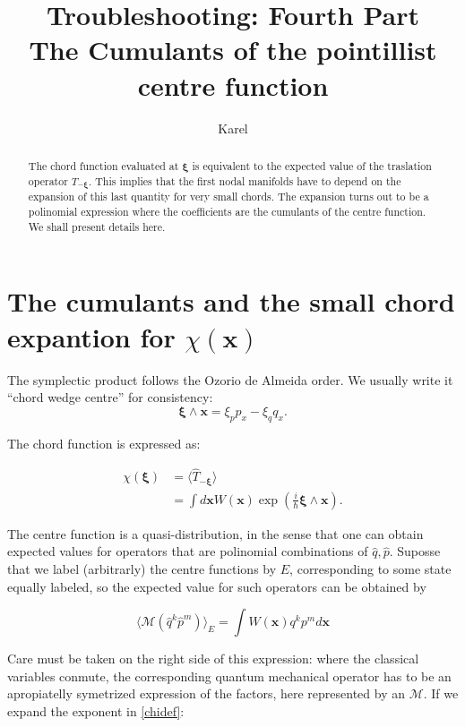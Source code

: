 \documentclass[a4paper,12pt]{article}
\title{ Troubleshooting: Fourth Part\\ The Cumulants of the pointillist centre function}
\author{Karel}
\newcommand{\ihb}{\frac{i}{\hbar}}
\newcommand{\xfase}{\mathbf{x}}
\newcommand{\xifase}{ {\boldsymbol{\xi}} }
\newcommand{\Prom}[2]{\langle #1\rangle_{#2}}
\begin{document}
\maketitle

\begin{abstract}
The chord function evaluated at $\xifase$ is equivalent to the
expected value of the traslation operator $T_{-\xifase}$. This implies
that the first nodal manifolds have to depend on the expansion of this
last quantity for very small chords. The expansion turns out to be
a polinomial expression where the coefficients are the 
cumulants of the centre function. We shall present details here. 
\end{abstract}


\section{The cumulants and the small chord expantion for $\chi(\xfase) $}

The symplectic product follows the Ozorio de Almeida order. We usually
write it ``chord wedge centre'' for consistency:
\begin{equation}
\xifase\wedge\xfase=\xi_p p_x -  \xi_q q_x.
\end{equation}

The chord function is expressed as:

\begin{align}\label{chidef}
\chi(\xifase) & = \langle \hat{T}_{ -\xifase } \rangle \\ 
& = \int d\xfase  W(\xfase) \exp( \ihb \xifase \wedge \xfase).
\end{align}

The centre function is a quasi-distribution, in the sense
that one can obtain expected values for operators that
are polinomial combinations of $\hat{q}, \hat{p}$. Suposse that
we label (arbitrarly) the centre functions by $E$, corresponding to
some state equally labeled, so the expected value for such operators
can be obtained by 

\begin{equation}\label{expectedqp}
\Prom{ \mathcal {M} (\hat{q}^k\hat{p}^m)}{E}=\int W(\xfase) q^k p^m d \xfase
\end{equation}

Care must be taken on the right side of this expression: where the
classical variables conmute, the corresponding 
quantum mechanical operator has to be an apropiatelly symetrized expression
of the factors, here represented by an $\mathcal{M}$. If we expand the
exponent in \ref{chidef}:
\end{document}
